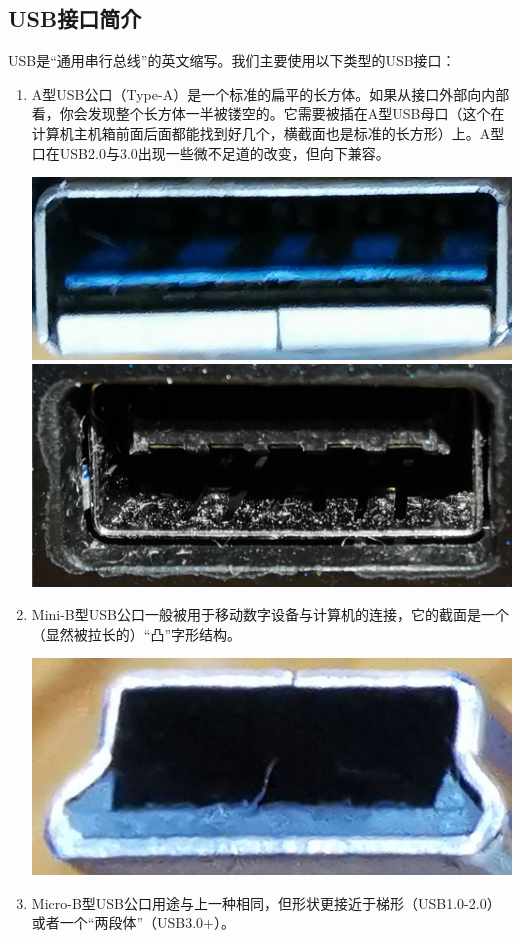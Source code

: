 \subsection{USB接口简介}
USB是“通用串行总线”的英文缩写。我们主要使用以下类型的USB接口：
\begin{enumerate}
	\item A型USB公口（Type-A）是一个标准的扁平的长方体。如果从接口外部向内部看，你会发现整个长方体一半被镂空的。它需要被插在A型USB母口（这个在计算机主机箱前面后面都能找到好几个，横截面也是标准的长方形）上。A型口在USB2.0与3.0出现一些微不足道的改变，但向下兼容。
	\begin{center}
		\includegraphics[width=0.7\linewidth]{pic/A-USB-1}\includegraphics[width=0.7\linewidth]{pic/A-USB-2}
	\end{center}
	\item Mini-B型USB公口一般被用于移动数字设备与计算机的连接，它的截面是一个（显然被拉长的）“凸”字形结构。
	\begin{center}
		\includegraphics[width=0.7\linewidth]{pic/Mini-USB-B-1}
	\end{center}
	\item Micro-B型USB公口用途与上一种相同，但形状更接近于梯形（USB1.0-2.0）或者一个“两段体”（USB3.0+）。
	\begin{center}

\end{center}
\end{enumerate}
